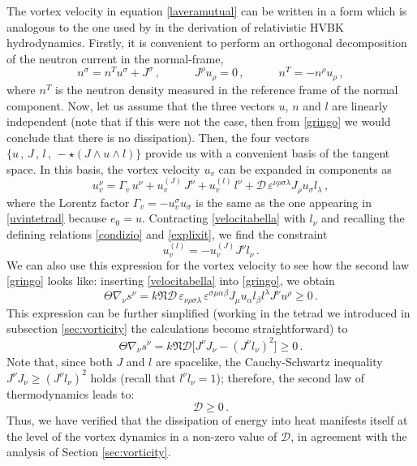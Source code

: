 \documentclass[preprints,article,accept,moreauthors,pdftex]{mdpi}
\newcommand{\spc}{\quad \quad \quad}
\begin{document}
The vortex velocity in equation \eqref{laveramutual} can be written in a form which is analogous to the one used  by \citet{GusakovHVBK} in the derivation of relativistic HVBK hydrodynamics.
Firstly, it is convenient to perform an orthogonal decomposition of the neutron current in the normal-frame,
\begin{equation}
\label{pizzobaldo}
n^\sigma = n^{T} u^\sigma + J^\sigma \, ,   \spc J^\rho u_\rho =0  \, , \spc n^{T} 
=-n^\rho u_\rho \, , 
\end{equation}
where $n^{T}$ is the neutron density  measured in the reference frame of the normal component. Now, let us assume that the three vectors $u$, $n$ and $l$ are linearly independent (note that if this were not the case, then from \eqref{gringo} we would conclude that there is no dissipation). 
Then, the four vectors $\{ u\, , \, J\, , \, l\, , \,  -{\star} (J \wedge u \wedge l)\}$ provide us with a convenient basis of the tangent space. In this basis, the vortex velocity $u_v$ can be expanded in components as
\begin{equation}
\label{velocitabella}
u_v^\nu = \Gamma_v \, u^\nu + u_v^{(J)} \, J^\nu +u_v^{(l)} \, l^\nu + \mathcal{D} \, \varepsilon^{\nu \rho \sigma \lambda} J_\rho u_\sigma l_\lambda \, ,
\end{equation}
where the Lorentz factor $\Gamma_v = -u_v^\sigma u_\sigma $ is the same as the one appearing in  \eqref{uvintetrad} because $e_0=u$. 
Contracting \eqref{velocitabella} with $l_\nu$ and recalling the defining relations \eqref{condizio} and \eqref{explixit}, we find the constraint
\begin{equation}\label{constr}
u_v^{(l)} = - u_v^{(J)} J^\nu l_\nu \, .
\end{equation}
We can also use this expression for the vortex velocity to see how the second law \eqref{gringo} looks like: inserting \eqref{velocitabella} into \eqref{gringo}, we obtain  
\begin{equation}
\Theta \nabla_\nu s^\nu = k \mathfrak{N} \mathcal{D} \, \varepsilon_{\nu \rho \sigma \lambda}  \, \varepsilon^{\sigma \mu \alpha \beta} J_\mu u_\alpha l_\beta l^\lambda  J^\nu u^\rho \geq 0 \, .
\end{equation}
This expression can be further  simplified (working in the tetrad we introduced in subsection \ref{sec:vorticity} the calculations become straightforward) to 
\begin{equation}
\Theta \nabla_\nu s^\nu = k \mathfrak{N} \mathcal{D} \big[ J^\nu J_\nu - (J^\nu l_\nu)^2 \big] \geq 0 \, .
\end{equation}
Note that, since both $J$ and $l$ are spacelike, the Cauchy-Schwartz inequality $J^\nu J_\nu \geq (J^\nu l_\nu)^2$ holds (recall that $l^\nu l_\nu=1$); therefore, the second law of thermodynamics leads to:
\begin{equation}
\label{sesso}
\mathcal{D} \geq 0 \, .
\end{equation}
Thus, we have verified that the dissipation of energy into heat manifests itself at the level of the vortex dynamics in a non-zero value of $\mathcal{D}$, in agreement with the analysis of Section \ref{sec:vorticity}. 
\end{document}
